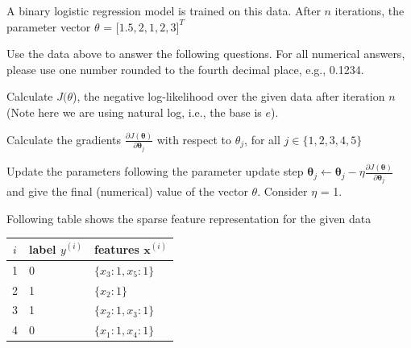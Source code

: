 \documentclass[11pt]{exam}
\numberwithin{equation}{section} %
\numberwithin{figure}{section} %
\numberwithin{table}{section} %
\newcommand{\xv}{\mathbf{x}}
\newcommand{\thetav     }{\boldsymbol \theta     }
\begin{document}
A binary logistic regression model is trained on this data. After $n$ iterations, the parameter vector $\theta$ = $\lbrack 1.5, 2, 1, 2, 3 \rbrack^T$

Use the data above to answer the following questions. For all numerical answers, please use one number rounded to the  fourth decimal place, e.g., 0.1234.
 \begin{questions}
     \question[1] Calculate $J(\theta$), the negative log-likelihood over the given data after iteration $n$ (Note here we are using natural log, i.e., the base is $e$). 
    
    \begin{your_solution}
    \bigskip \bigskip \bigskip \bigskip \bigskip \bigskip \bigskip \bigskip
    \bigskip \bigskip \bigskip 
  
    \end{your_solution}
    
    \clearpage
    
     \question[2] Calculate the gradients $\frac{\partial J(\thetav)}{\partial \thetav_j}$ with respect to $\theta_{j}$, for all $j \in \{1, 2, 3, 4, 5\}$

    
    \begin{your_solution}
    \bigskip \bigskip \bigskip \bigskip \bigskip \bigskip \bigskip \bigskip
    \bigskip \bigskip \bigskip \bigskip \bigskip \bigskip \bigskip \bigskip
  
    \end{your_solution}
    
    \clearpage
     \question[1] Update the parameters following the parameter update step $\thetav_j \leftarrow \thetav_j - \eta \frac{\partial J(\thetav)}{\partial \thetav_j}$ and give the final (numerical) value of the vector $\theta$. Consider $\eta$ = 1.

    
     \begin{your_solution}
    \bigskip \bigskip \bigskip \bigskip \bigskip \bigskip \bigskip \bigskip
    \bigskip \bigskip \bigskip 
  
    \end{your_solution}
    
     \question[1] Following table shows the sparse feature representation for the given data
     \begin{table}[h]
    \centering
     \begin{tabular}{cll}
    \toprule
    $i$ & {\bf label} $y^{(i)}$ & {\bf features} $\xv^{(i)}$ \\
    \midrule
    1 & 0 &  $\{ x_3: 1, x_5: 1 \}$ \\
    2 & 1 & $\{ x_2: 1 \}$ \\
    3 & 1 & $\{ x_2: 1, x_3: 1 \}$ \\
    4 & 0 & $\{ x_1: 1, x_4: 1 \}$ \\
    

\end{tabular}
\end{table}
\end{questions}
\end{document}
